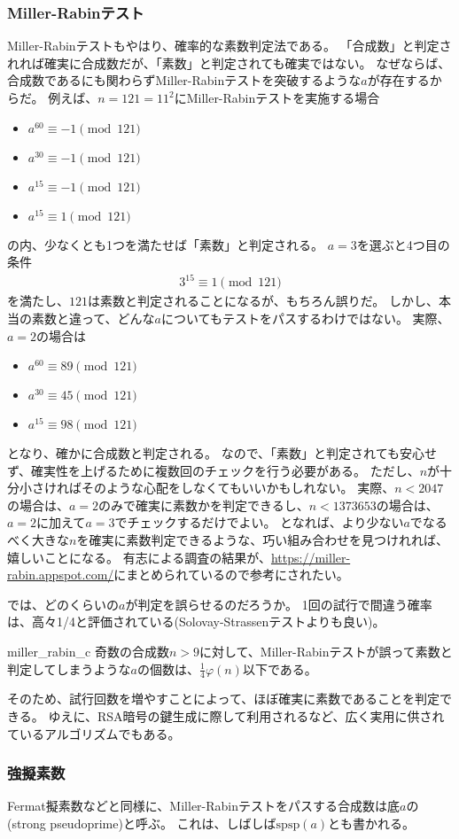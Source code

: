 \subsubsection{Miller-Rabinテスト}
Miller-Rabinテストもやはり、確率的な素数判定法である。
「合成数」と判定されれば確実に合成数だが、「素数」と判定されても確実ではない。
なぜならば、合成数であるにも関わらずMiller-Rabinテストを突破するような$a$が存在するからだ。
例えば、$n=121=11^2$にMiller-Rabinテストを実施する場合
\begin{itemize}
\item $a^{60} \equiv -1 \pmod{121}$
\item $a^{30} \equiv -1 \pmod{121}$
\item $a^{15} \equiv -1 \pmod{121}$
\item $a^{15} \equiv 1 \pmod{121}$
\end{itemize}
の内、少なくとも1つを満たせば「素数」と判定される。
$a=3$を選ぶと4つ目の条件
\begin{align*}
3^{15} \equiv 1 \pmod{121}
\end{align*}
を満たし、$121$は素数と判定されることになるが、もちろん誤りだ。
しかし、本当の素数と違って、どんな$a$についてもテストをパスするわけではない。
実際、$a=2$の場合は
\begin{itemize}
\item $a^{60} \equiv 89 \pmod{121}$
\item $a^{30} \equiv 45 \pmod{121}$
\item $a^{15} \equiv 98 \pmod{121}$
\end{itemize}
となり、確かに合成数と判定される。
なので、「素数」と判定されても安心せず、確実性を上げるために複数回のチェックを行う必要がある。
ただし、$n$が十分小さければそのような心配をしなくてもいいかもしれない。
実際、$n<2047$の場合は、$a=2$のみで確実に素数かを判定できるし、$n<1373653$の場合は、$a=2$に加えて$a=3$でチェックするだけでよい。
となれば、より少ない$a$でなるべく大きな$n$を確実に素数判定できるような、巧い組み合わせを見つけれれば、嬉しいことになる。
有志による調査の結果が、\url{https://miller-rabin.appspot.com/}にまとめられているので参考にされたい。


では、どのくらいの$a$が判定を誤らせるのだろうか。
1回の試行で間違う確率は、高々1/4と評価されている(Solovay-Strassenテストよりも良い)。

\begin{Prop}{}{miller_rabin_c}
奇数の合成数$n>9$に対して、Miller-Rabinテストが誤って素数と判定してしまうような$a$の個数は、$\frac{1}{4}\varphi(n)$以下である。
\end{Prop}

そのため、試行回数を増やすことによって、ほぼ確実に素数であることを判定できる。
ゆえに、RSA暗号の鍵生成に際して利用されるなど、広く実用に供されているアルゴリズムでもある。

\subsubsection{強擬素数}
Fermat擬素数などと同様に、Miller-Rabinテストをパスする合成数は底$a$の(strong pseudoprime)と呼ぶ。
これは、しばしば$\mbox{spsp}(a)$とも書かれる。

